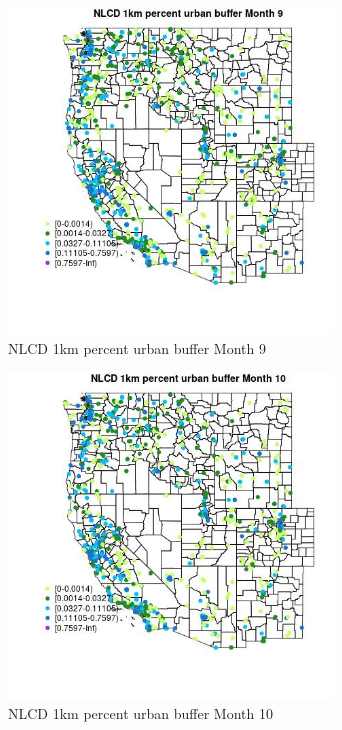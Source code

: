 \begin{figure} 
\centering  
\includegraphics[width=0.77\textwidth]{Code_Outputs/Report_ML_input_PM25_Step4_part_e_de_duplicated_aves_compiled_2019-05-21wNAs_MapObsMo9NLCD_1km_percent_urban_buffer.jpg} 
\caption{\label{fig:Report_ML_input_PM25_Step4_part_e_de_duplicated_aves_compiled_2019-05-21wNAsMapObsMo9NLCD_1km_percent_urban_buffer}NLCD 1km percent urban buffer Month 9} 
\end{figure} 
 

\begin{figure} 
\centering  
\includegraphics[width=0.77\textwidth]{Code_Outputs/Report_ML_input_PM25_Step4_part_e_de_duplicated_aves_compiled_2019-05-21wNAs_MapObsMo10NLCD_1km_percent_urban_buffer.jpg} 
\caption{\label{fig:Report_ML_input_PM25_Step4_part_e_de_duplicated_aves_compiled_2019-05-21wNAsMapObsMo10NLCD_1km_percent_urban_buffer}NLCD 1km percent urban buffer Month 10} 
\end{figure} 
 

